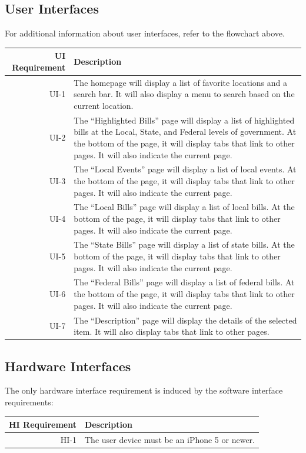 \documentclass[12pt,oneside,letterpaper]{article}
\newcounter{use_case}
\begin{document}
\subsection{User Interfaces}
For additional information about user interfaces, refer to the
flowchart above.
\begin{longtabu}{|r|X|}
  \hline
  UI Requirement & Description \\
  \hline
  UI-1 & The homepage will display a list of favorite locations and a search bar. It will also display a menu to search based on the current location. \\
  \hline
  UI-2 & The ``Highlighted Bills'' page will display a list of highlighted bills at the Local, State, and Federal levels of government. At the bottom of the page, it will display tabs that link to other pages. It will also indicate the current page. \\
  \hline
  UI-3 & The ``Local Events'' page will display a list of local events. At the bottom of the page, it will display tabs that link to other pages. It will also indicate the current page. \\
  \hline
  UI-4 & The ``Local Bills'' page will display a list of local bills. At the bottom of the page, it will display tabs that link to other pages. It will also indicate the current page.\\
  \hline
  UI-5 & The ``State Bills'' page will display a list of state bills. At the bottom of the page, it will display tabs that link to other pages. It will also indicate the current page.\\
  \hline
  UI-6 & The ``Federal Bills'' page will display a list of federal bills. At the bottom of the page, it will display tabs that link to other pages. It will also indicate the current page.\\
  \hline
  UI-7 & The ``Description'' page will display the details of the selected item. It will also display tabs that link to other pages. \\
  \hline
\end{longtabu}

\subsection{Hardware Interfaces}
The only hardware interface requirement is induced by the software interface requirements:
\begin{longtabu}{|r|X|}
  \hline
  HI Requirement & Description \\
  \hline
  HI-1 & The user device must be an iPhone 5 or newer.\\
  \hline
\end{longtabu}
\end{document}
